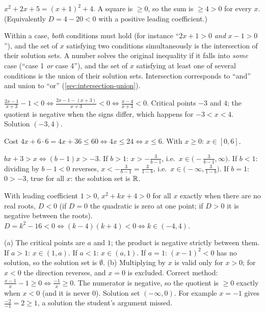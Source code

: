 $x^2+2x+5=(x+1)^2+4$. A square is $\ge0$, so the sum is $\ge4>0$ for every $x$. (Equivalently $D=4-20<0$ with a
positive leading coefficient.)

Within a case, \emph{both} conditions must hold (for instance ``$2x+1>0$ \emph{and} $x-1>0$''), and the set of $x$
satisfying two conditions simultaneously is the intersection of their solution sets. A number solves the
original inequality if it falls into \emph{some} case (``case 1 \emph{or} case 4''), and the set of $x$ satisfying
at least one of several conditions is the union of their solution sets. Intersection corresponds to ``and'' and
union to ``or'' (\cref{sec:intersection-union}).

$\frac{2x-1}{x+3}-1<0\Leftrightarrow\frac{2x-1-(x+3)}{x+3}<0\Leftrightarrow\frac{x-4}{x+3}<0$. Critical points
$-3$ and $4$; the quotient is negative when the signs differ, which happens for $-3<x<4$. Solution $(-3,4)$.

Cost $4x+6\cdot6=4x+36\le60\Leftrightarrow4x\le24\Leftrightarrow x\le6$. With $x\ge0$: $x\in[0,6]$.

$bx+3>x\Leftrightarrow(b-1)x>-3$.
If $b>1$: $x>-\frac3{b-1}$, i.e.\ $x\in\big(-\frac3{b-1},\infty\big)$.
If $b<1$: dividing by $b-1<0$ reverses, $x<-\frac3{b-1}=\frac3{1-b}$, i.e.\ $x\in\big(-\infty,\frac3{1-b}\big)$.
If $b=1$: $0>-3$, true for all $x$: the solution set is $\mathbb{R}$.

With leading coefficient $1>0$, $x^2+kx+4>0$ for all $x$ exactly when there are no real roots, $D<0$ (if $D=0$
the quadratic is zero at one point; if $D>0$ it is negative between the roots). $D=k^2-16<0\Leftrightarrow
(k-4)(k+4)<0\Leftrightarrow k\in(-4,4)$.

(a) The critical points are $a$ and $1$; the product is negative strictly between them.
If $a>1$: $x\in(1,a)$. If $a<1$: $x\in(a,1)$. If $a=1$: $(x-1)^2<0$ has no solution, so the solution set is
$\emptyset$.
(b) Multiplying by $x$ is valid only for $x>0$; for $x<0$ the direction reverses, and $x=0$ is excluded. Correct
method: $\frac{x-1}{x}-1\ge0\Leftrightarrow\frac{-1}{x}\ge0$. The numerator is negative, so the quotient is
$\ge0$ exactly when $x<0$ (and it is never $0$). Solution set $(-\infty,0)$. For example $x=-1$ gives
$\frac{-2}{-1}=2\ge1$, a solution the student's argument missed.

